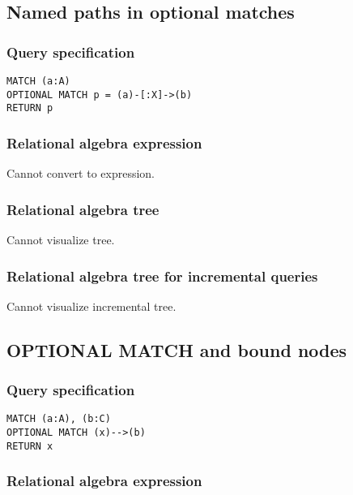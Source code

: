 \subsection{Named paths in optional matches}

\subsubsection*{Query specification}

\begin{lstlisting}
MATCH (a:A)
OPTIONAL MATCH p = (a)-[:X]->(b)
RETURN p
\end{lstlisting}

\subsubsection*{Relational algebra expression}

Cannot convert to expression.

\subsubsection*{Relational algebra tree}

Cannot visualize tree.

\subsubsection*{Relational algebra tree for incremental queries}

Cannot visualize incremental tree.

\subsection{OPTIONAL MATCH and bound nodes}

\subsubsection*{Query specification}

\begin{lstlisting}
MATCH (a:A), (b:C)
OPTIONAL MATCH (x)-->(b)
RETURN x
\end{lstlisting}

\subsubsection*{Relational algebra expression}

